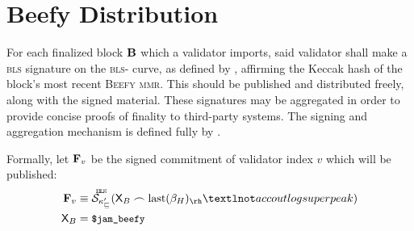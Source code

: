 \section{Beefy Distribution}
\label{sec:beefy}

For each finalized block $\mathbf{B}$ which a validator imports, said validator shall make a \textsc{bls} signature on the \textsc{bls}- curve, as defined by \cite{bls12-381}, affirming the Keccak hash of the block's most recent \textsc{Beefy} \textsc{mmr}. This should be published and distributed freely, along with the signed material. These signatures may be aggregated in order to provide concise proofs of finality to third-party systems. The signing and aggregation mechanism is defined fully by \cite{cryptoeprint:2022/1611}.

Formally, let $\mathbf{F}_{v}$ be the signed commitment of validator index $v$ which will be published:
\begin{align}\label{eq:accoutsignedcommitment}
  \accoutcommitment{v} &\equiv \blssigndata{\activeset'\sub{v}}{\Xbeefy \concat \text{last}(\recenthistory)_\rh¬accoutlogsuperpeak}\\
  \Xbeefy &= \token{\$jam\_beefy}
\end{align}
